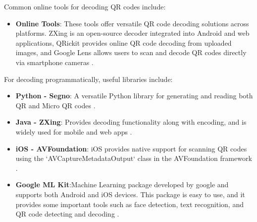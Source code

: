 Common online tools for decoding QR codes include:
\begin{itemize}
	\item \textbf{Online Tools}: These tools offer versatile QR code decoding solutions across platforms. ZXing is an open-source decoder integrated into Android and web applications, QRickit provides online QR code decoding from uploaded images, and Google Lens allows users to scan and decode QR codes directly via smartphone cameras \cite{ZXing2024, QRickit2024}.
	
\end{itemize}

For decoding programmatically, useful libraries include:
\begin{itemize}
	\item \textbf{Python - Segno}: A versatile Python library for generating and reading both QR and Micro QR codes \cite{Segno2024}.
	\item \textbf{Java - ZXing}: Provides decoding functionality along with encoding, and is widely used for mobile and web apps \cite{ZXing2024}.
	\item \textbf{iOS - AVFoundation}: iOS provides native support for scanning QR codes using the `AVCaptureMetadataOutput` class in the AVFoundation framework \cite{AVFoundation2024}.
	\item \textbf{Google ML Kit}:Machine Learning package developed by google and supports both Android and iOS devices. This package is easy to use, and it provides some important tools such as face detection, text recognition, and QR code detecting and decoding \cite{GoogleMLKit}.
\end{itemize}
 
